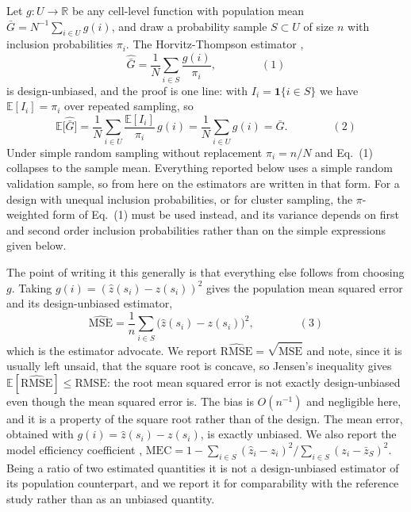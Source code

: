 \documentclass[preprint,12pt,authoryear]{elsarticle}
\newcommand{\eqnum}[1]{\qquad\qquad\mathrm{(#1)}}
\begin{document}
Let $g: U \rightarrow \mathbb{R}$ be any cell-level function with population
mean $\bar G = N^{-1}\sum_{i \in U} g(i)$, and draw a probability sample
$S \subset U$ of size $n$ with inclusion probabilities $\pi_i$. The
Horvitz-Thompson estimator \citep{horvitz1952},
\[
\widehat{\bar G} = \frac{1}{N}\sum_{i \in S} \frac{g(i)}{\pi_i},
\eqnum{1}
\]
is design-unbiased, and the proof is one line: with $I_i = \mathbf{1}\{i \in S\}$
we have $\mathbb{E}[I_i] = \pi_i$ over repeated sampling, so
\[
\mathbb{E}\big[\widehat{\bar G}\big]
= \frac{1}{N}\sum_{i \in U} \frac{\mathbb{E}[I_i]}{\pi_i}\,g(i)
= \frac{1}{N}\sum_{i \in U} g(i) = \bar G .
\eqnum{2}
\]
Under simple random sampling without replacement $\pi_i = n/N$ and Eq.~(1)
collapses to the sample mean. Everything reported below uses a simple random
validation sample, so from here on the estimators are written in that form. For
a design with unequal inclusion probabilities, or for cluster sampling, the
$\pi$-weighted form of Eq.~(1) must be used instead, and its variance depends on
first and second order inclusion probabilities rather than on the simple
expressions given below.

The point of writing it this generally is that everything else follows from
choosing $g$. Taking $g(i) = (\hat z(s_i)-z(s_i))^2$ gives the population mean
squared error and its design-unbiased estimator,
\[
\widehat{\mathrm{MSE}} = \frac{1}{n}\sum_{i \in S}\big(\hat z(s_i)-z(s_i)\big)^2 ,
\eqnum{3}
\]
which is the estimator \citet{wadoux2021} advocate. We report
$\widehat{\mathrm{RMSE}} = \sqrt{\widehat{\mathrm{MSE}}}$ and note, since it is
usually left unsaid, that the square root is concave, so Jensen's inequality
gives $\mathbb{E}[\widehat{\mathrm{RMSE}}] \le \mathrm{RMSE}$: the root mean
squared error is not exactly design-unbiased even though the mean squared error
is. The bias is $O(n^{-1})$ and negligible here, and it is a property of the
square root rather than of the design. The mean error, obtained with
$g(i) = \hat z(s_i)-z(s_i)$, is exactly unbiased. We also report the model efficiency coefficient \citep{nash1970},
$\mathrm{MEC} = 1 - \sum_{i \in S}(\hat z_i - z_i)^2 / \sum_{i \in S}(z_i - \bar z_S)^2$.
Being a ratio of two estimated quantities it is not a design-unbiased estimator
of its population counterpart, and we report it for comparability with the
reference study rather than as an unbiased quantity.
\end{document}
